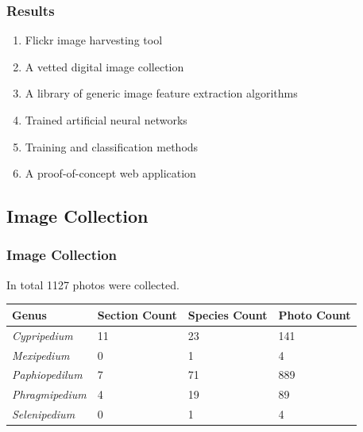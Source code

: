 \documentclass[]{beamer}
\begin{document}
    \begin{frame}
        \frametitle{Results}

        \begin{enumerate}
            \item Flickr image harvesting tool
            \item A vetted digital image collection
            \item A library of generic image feature extraction algorithms
            \item Trained artificial neural networks
            \item Training and classification methods
            \item A proof-of-concept web application
        \end{enumerate}
    \end{frame}

    \subsection{Image Collection}

    \begin{frame}[plain]
        \frametitle{Image Collection}

        In total 1127 photos were collected.

        \begin{table}[h]\scriptsize
            \begin{center}
            \begin{tabular}{llll}
            \toprule
            \textbf{Genus} & \textbf{Section Count} & \textbf{Species Count} & \textbf{Photo Count} \\
            \midrule
            \textit{Cypripedium} & 11 & 23 & 141 \\
            \textit{Mexipedium} & 0 & 1 & 4 \\
            \textit{Paphiopedilum} & 7 & 71 & 889 \\
            \textit{Phragmipedium} & 4 & 19 & 89 \\
            \textit{Selenipedium} & 0 & 1 & 4 \\
            \bottomrule
            \end{tabular}
            \end{center}
        \end{table}
    \end{frame}
\end{document}
